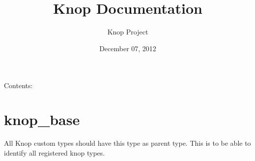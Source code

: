 \documentclass[letterpaper,10pt,english]{sphinxmanual}
\title{Knop Documentation}
\date{December 07, 2012}
\author{Knop Project}
\begin{document}
\maketitle
\tableofcontents
{}\label{index::doc}


Contents:


\chapter{knop\_base}
\label{knop_base:knop-base}\label{knop_base::doc}\label{knop_base:welcome-to-knop-s-documentation}

\begin{fulllineitems}
\label{knop_base:knop_knoptype}
All Knop custom types should have this type as parent type.
This is to be able to identify all registered knop types.

\begin{fulllineitems}
\label{knop_base:knop_knoptype.isknoptype}
\end{fulllineitems}



\begin{fulllineitems}
\end{fulllineitems}


\end{fulllineitems}

\end{document}
